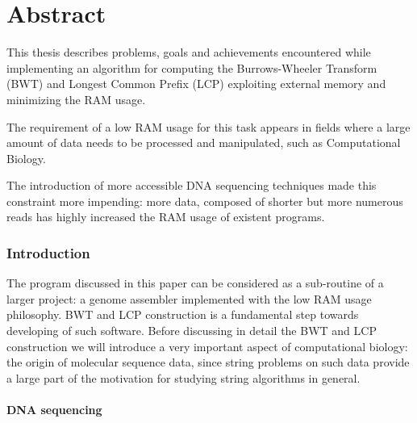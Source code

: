 \documentclass[a4paper,12pt, oneside]{article}
\begin{document}


\part*{Abstract}
\label{ch:Abstract}

\thispagestyle{empty}
This thesis describes problems, goals and achievements encountered while implementing an algorithm for computing the Burrows-Wheeler Transform (BWT) and Longest Common Prefix (LCP) exploiting external memory and minimizing the RAM usage.

The requirement of a low RAM usage for this task appears in fields where a large amount of data needs to be processed and manipulated, such as Computational Biology.

The introduction of more accessible DNA sequencing techniques made this constraint more impending: more data, composed of shorter but more numerous reads has highly increased the RAM usage of existent programs.

\newpage
\tableofcontents
\newpage

\section{Introduction}

The program discussed in this paper can be considered as a sub-routine of a larger project: a genome assembler implemented with the low RAM usage philosophy. BWT and LCP construction is a fundamental step towards developing of such software. Before discussing in detail the BWT and LCP construction we will introduce a very important aspect of computational biology: the origin of molecular sequence data, since string problems on such data provide a large part of the motivation for studying string algorithms in general.

\subsection{DNA sequencing}
\end{document}
